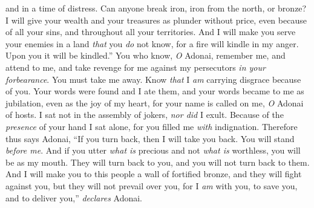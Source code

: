 \begin{biblechapter}
and in a time of distress.
\verse Can anyone break iron, 
iron from the north, or bronze?
\verse I will give your wealth and your treasures 
as plunder without price, 
even because of all your sins, 
and throughout all your territories.
\verse And I will make you serve your enemies 
in a land \textit{that} you \textit{do} not know, 
for a fire will kindle in my anger. 
Upon you it will be kindled.”
\verse You who know, \textit{O} Adonai, remember me, and attend to me, 
and take revenge for me against my persecutors \textit{in your forbearance}. 
You must take me away. 
Know \textit{that} I \textit{am} carrying disgrace because of you.
\verse Your words were found and I ate them, 
and your words became to me as jubilation, 
even as the joy of my heart, 
for your name is called on me, \textit{O} Adonai of hosts.
\verse I sat not in the assembly of jokers, 
\textit{nor did} I exult. 
Because of the \textit{presence} of your hand I sat alone, 
for you filled me \textit{with} indignation.
\verse Therefore thus says Adonai,
\verse “If you turn back, then I will take you back. 
You will stand \textit{before me}. 
And if you utter \textit{what is} precious and not \textit{what is} worthless, 
you will be as my mouth. 
They will turn back to you, 
and you will not turn back to them.
\verse And I will make you to this people 
a wall of fortified bronze, 
and they will fight against you, 
but they will not prevail over you, 
for I \textit{am} with you, to save you, 
and to deliver you,” \textit{declares} Adonai.
\end{biblechapter}

